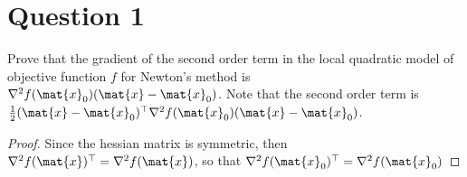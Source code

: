 \section{Question 1}

\begin{question}
    Prove that the gradient of the second order term in the local quadratic model of objective function $f$ for Newton's method is $\nabla^2 f(\mat{x}_0)(\mat{x}-\mat{x}_0)$. Note that the second order term is $\frac{1}{2}(\mat{x} - \mat{x}_0)^\top \nabla^2 f(\mat{x}_0) (\mat{x}-\mat{x}_0)$.
\end{question}

\begin{answer}
    \begin{proof}
        Since the hessian matrix is symmetric, then $\nabla^2f(\mat{x})^\top = \nabla^2f(\mat{x})$, so that $\nabla^2f(\mat{x}_0)^\top = \nabla^2f(\mat{x}_0)$
    \end{proof}
\end{answer}